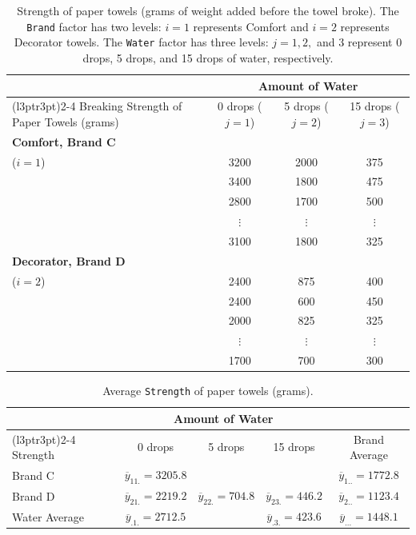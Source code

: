 \documentclass[
]{report}
\begin{document}
\begin{table}[!h]
\centering
\caption{\label{tab:tab44}Strength of paper towels (grams of weight added before the towel broke). The \texttt{Brand} factor has two levels: $i = 1$ represents Comfort and $i = 2$ represents Decorator towels. The \texttt{Water} factor has three levels: $j = 1, 2,$ and 3 represent 0 drops, 5 drops, and 15 drops of water, respectively.}
\centering
\begin{tabular}[t]{>{\raggedright\arraybackslash}p{3.5cm}ccc}
\toprule
\multicolumn{1}{c}{ } & \multicolumn{3}{c}{Amount of Water} \\
\cmidrule(l{3pt}r{3pt}){2-4}
Breaking Strength of Paper Towels (grams) & 0 drops ($j=1$) & 5 drops ($j=2$) & 15 drops ($j=3$)\\
\midrule
\textbf{Comfort, Brand C} \\ ($i = 1$) & 3200 & 2000 & 375\\
 & 3400 & 1800 & 475\\
 & 2800 & 1700 & 500\\
 & $\vdots$ & $\vdots$ & \vphantom{1} $\vdots$\\
 & 3100 & 1800 & 325\\
\addlinespace
\textbf{Decorator, Brand D} \\ ($i = 2$) & 2400 & 875 & 400\\
 & 2400 & 600 & 450\\
 & 2000 & 825 & 325\\
 & $\vdots$ & $\vdots$ & $\vdots$\\
 & 1700 & 700 & 300\\
\bottomrule
\end{tabular}
\end{table}

\begin{table}[!h]
\centering
\caption{\label{tab:tab45} Average \texttt{Strength} of paper towels (grams).}
\centering
\begin{tabular}[t]{lcccc}
\toprule
\multicolumn{1}{c}{ } & \multicolumn{3}{c}{Amount of Water} & \multicolumn{1}{c}{ } \\
\cmidrule(l{3pt}r{3pt}){2-4}
Strength & 0 drops & 5 drops & 15 drops & Brand Average\\
\midrule
Brand C & $\overline{y}_{11.} = 3205.8$ &  &  & $\overline{y}_{1..} = 1772.8$\\
Brand D & $\overline{y}_{21.} = 2219.2$ & $\overline{y}_{22.} = 704.8$ & $\overline{y}_{23.} = 446.2$ & $\overline{y}_{2..} = 1123.4$\\
Water Average & $\overline{y}_{.1.} = 2712.5$ &  & $\overline{y}_{.3.} = 423.6$ & $\overline{y}_{...} = 1448.1$\\
\bottomrule
\end{tabular}
\end{table}
\end{document}
